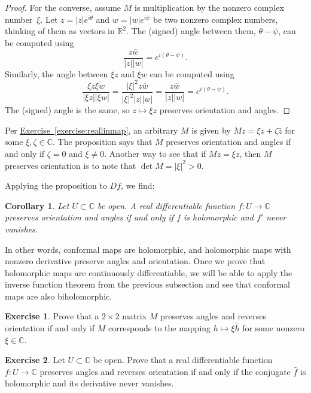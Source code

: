 \documentclass[12pt,openany]{book}
\newcommand{\sabs}[1]{\lvert {#1} \rvert}
\newcommand{\C}{{\mathbb{C}}}
\newcommand{\R}{{\mathbb{R}}}
\theoremstyle{plain}
\newtheorem{cor}[thm]{Corollary}
\theoremstyle{remark}
\theoremstyle{definition}
\newenvironment{exbox}{%
    \def\FrameCommand{\vrule width 1pt \relax\hspace{10pt}}%
    \MakeFramed{\advance\hsize-\width\FrameRestore}%
}{%
    \endMakeFramed
}
\theoremstyle{exercise}
\newtheorem{exercise}{Exercise}[section]
\theoremstyle{example}
\newcommand{\exerciseref}[1]{\hyperref[#1]{Exercise~\ref*{#1}}}
\begin{document}
\begin{proof}
For the converse, assume $M$ is multiplication by the
nonzero complex number~$\xi$.
Let
$z = \sabs{z} e^{i\theta}$ and $w = \sabs{w} e^{i\psi}$ be two nonzero
complex numbers, thinking of them as vectors in $\R^2$.
The (signed) angle between them, $\theta-\psi$, can be
computed using
\begin{equation*}
\frac{z\bar{w}}{\sabs{z}\sabs{w}}
=
e^{i(\theta-\psi)} .
\end{equation*}
Similarly, the angle between 
$\xi z$ and $\xi w$ can be computed using
\begin{equation*}
\frac{\xi z\overline{\xi w}}{\sabs{\xi z}\sabs{\xi w}} 
=
\frac{\sabs{\xi}^2 z\overline{w}}{\sabs{\xi}^2 \sabs{z}\sabs{w}} 
=
\frac{z\overline{w}}{\sabs{z}\sabs{w}} = e^{i(\theta-\psi)}.
\end{equation*}
The (signed) angle is the same, so $z \mapsto \xi z$ preserves
orientation and angles.
\end{proof}

Per \exerciseref{exercise:reallinmap},
an arbitrary $M$ is given by
$Mz = \xi z + \zeta \bar{z}$ for some $\xi,\zeta \in \C$.
The proposition says that $M$ preserves orientation and angles if and only
if $\zeta=0$ and $\xi \neq 0$.
Another way to see that if $Mz = \xi z$, then
$M$ preserves orientation is to note that
$\det M = \sabs{\xi}^2 > 0$.

Applying the proposition to $Df$, we find:

\begin{cor}
Let $U \subset \C$ be open.
A real differentiable function $f \colon U \to \C$
preserves orientation and angles
if and only if $f$ is holomorphic and $f'$ never vanishes.
\end{cor}

In other words, conformal maps are holomorphic, and holomorphic
maps with nonzero derivative preserve angles and orientation.
Once we prove that
holomorphic maps are continuously differentiable, we will be able to
apply the inverse function theorem from the previous
subsection and see that conformal maps are also biholomorphic.

\begin{exbox}
\begin{exercise}
Prove that a $2 \times 2$ matrix $M$ preserves angles and reverses
orientation if and only if $M$ corresponds to the mapping $h \mapsto \xi
\bar{h}$ for some nonzero $\xi \in \C$.
\end{exercise}

\begin{exercise}
Let $U \subset \C$ be open.
Prove that a real differentiable function $f \colon U \to \C$ preserves angles
and reverses orientation if and only if the conjugate $\bar{f}$ is
holomorphic and its derivative never vanishes.
\end{exercise}
\end{exbox}
\end{document}
